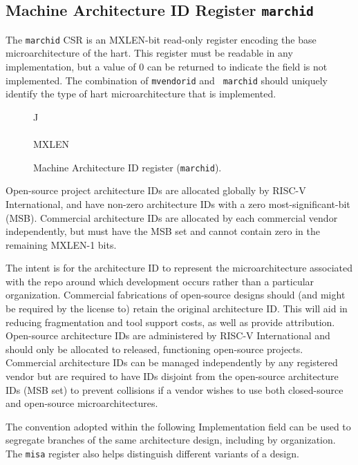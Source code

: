 \subsection{Machine Architecture ID Register {\tt marchid}}

The {\tt marchid} CSR is an MXLEN-bit read-only register encoding the
base microarchitecture of the hart.  This register must be readable in
any implementation, but a value of 0 can be returned to indicate the
field is not implemented.  The combination of {\tt mvendorid} and {\tt
  marchid} should uniquely identify the type of hart microarchitecture
that is implemented.

\begin{figure*}[h!]
{\footnotesize
\begin{center}
\begin{tabular}{J}
 \\
\hline
{} \\
\hline
MXLEN \\
\end{tabular}
\end{center}
}
\vspace{-0.1in}
\caption{Machine Architecture ID register ({\tt marchid}).}
\label{marchreg}
\end{figure*}

Open-source project architecture IDs are allocated globally by
RISC-V International, and have non-zero architecture IDs with a zero
most-significant-bit (MSB).  Commercial architecture IDs are allocated
by each commercial vendor independently, but must have the MSB set and
cannot contain zero in the remaining MXLEN-1 bits.

\begin{commentary}
The intent is for the architecture ID to represent the
microarchitecture associated with the repo around which development
occurs rather than a particular organization.  Commercial fabrications
of open-source designs should (and might be required by the license
to) retain the original architecture ID.  This will aid in reducing
fragmentation and tool support costs, as well as provide attribution.
Open-source architecture IDs are administered by RISC-V International
and should only be allocated to released, functioning open-source
projects.  Commercial architecture IDs can be managed independently by
any registered vendor but are required to have IDs disjoint from the
open-source architecture IDs (MSB set) to prevent collisions if a
vendor wishes to use both closed-source and open-source
microarchitectures.

The convention adopted within the following Implementation field can
be used to segregate branches of the same architecture design,
including by organization.  The {\tt misa} register also helps
distinguish different variants of a design.
\end{commentary}

